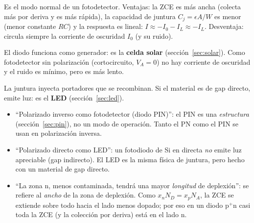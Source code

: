 \begin{description}[style=nextline,leftmargin=1.2em]
  \item[Modo fotoconductivo (polarización inversa, 3.\textsuperscript{er} cuadrante)]
  Es el modo normal de un fotodetector. Ventajas: la ZCE es más ancha (colecta más por
  deriva y es más rápida), la capacidad de juntura $C_j=\epsilon A/W$ es menor (menor
  constante $RC$) y la respuesta es lineal: $I\approx-I_0-I_L\approx-I_L$. Desventaja:
  circula siempre la corriente de oscuridad $I_0$ (y su ruido).
  \item[Modo fotovoltaico ($V_A>0$ fijada por la carga, 4.\textsuperscript{o} cuadrante)]
  El diodo funciona como generador: es la \textbf{celda solar} (sección~\ref{sec:solar}).
  Como fotodetector sin polarización (cortocircuito, $V_A=0$) no hay corriente de oscuridad
  y el ruido es mínimo, pero es más lento.
  \item[Polarización directa (1.\textsuperscript{er} cuadrante)] La juntura inyecta
  portadores que se recombinan. Si el material es de gap directo, emite luz: es el
  \textbf{LED} (sección~\ref{sec:led}).
\end{description}

\begin{ojo}[\diapo{10}]
\begin{itemize}
  \item ``Polarizado inverso como fotodetector (diodo PIN)'': el PIN es una
  \emph{estructura} (sección~\ref{sec:pin}), no un modo de operación. Tanto el PN como el
  PIN se usan en polarización inversa.
  \item ``Polarizado directo como LED'': un fotodiodo de Si en directa \emph{no} emite luz
  apreciable (gap indirecto). El LED es la misma física de juntura, pero hecho con un
  material de gap directo.
  \item ``La zona n, menos contaminada, tendrá una mayor \emph{longitud} de deplexión'':
  se refiere al \emph{ancho} de la zona de deplexión. Como $x_nN_D=x_pN_A$, la ZCE se
  extiende sobre todo hacia el lado menos dopado; por eso en un diodo p$^+$n casi toda la
  ZCE (y la colección por deriva) está en el lado n.
\end{itemize}
\end{ojo}

